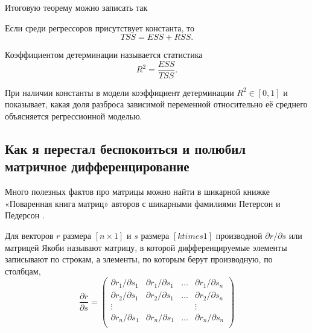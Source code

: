 \documentclass[12pt]{article}
\newcommand{\RSS}{RSS}
\newcommand{\ESS}{ESS}
\newcommand{\TSS}{TSS}
\begin{document}
Итоговую теорему можно записать так
\begin{theorem}
Если среди регрессоров присутствует константа, то
\[
\label{tss}
    \TSS = \ESS + \RSS.
\]
\end{theorem}

\begin{definition}
Коэффициентом детерминации называется статистика 
\[
R^2 = \frac{\ESS}{\TSS}.
\]    
\end{definition}



При наличии константы в модели коэффициент детерминации $R^2 \in [0,1]$ и показывает, какая доля разброса зависимой переменной относительно её среднего объясняется регрессионной моделью.







\subsection{Как я перестал беспокоиться и полюбил матричное дифференцирование}

Много полезных фактов про матрицы можно найти в шикарной книжке «Поваренная книга матриц» авторов с шикарными фамилиями Петерсон и Педерсон \cite{petersen2012matrix}.

\begin{definition}
Для векторов $r$ размера $[n \times 1]$ и $s$ размера $[k times 1]$ производной $\partial r/\partial s$ или матрицей Якоби называют матрицу, в которой дифференцируемые элементы записывают по строкам, а элементы, по которым берут производную, по столбцам,
    \[
    \frac{\partial r}{\partial s} = \begin{pmatrix}
        \partial r_1/\partial s_1 & \partial r_1/\partial s_1 & \dots & \partial r_1/\partial s_n \\
        \partial r_2/\partial s_1 & \partial r_2/\partial s_1 & \dots & \partial r_2/\partial s_n \\
        \vdots & & & \vdots \\
        \partial r_n/\partial s_1 & \partial r_n/\partial s_1 & \dots & \partial r_n/\partial s_n \\   
    \end{pmatrix}
    \]
\end{definition}
\end{document}
